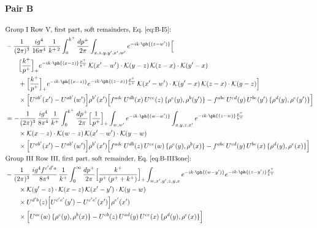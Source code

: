 \paragraph{Pair B}
\begingroup\color{pB}
\begin{align}
&\text{Group I Row V, first part, soft remainders, Eq.~\eqref{eq:B-I5}:}\notag\\
&-\frac{1}{(2\pi)^{3}}\,\frac{ig^{4}}{16\pi^{4}}\,\frac{1}{k^{+\,2}}\int_{0}^{k^{+}}\frac{dp^{+}}{2\pi}\int_{x,z,y,y',x',w'}e^{-ik\cdot\ph{(z-w')}}\Big[\notag\\
&\qquad\Big[\frac{k^{+}}{p^{+}}\Big]_{+}e^{-ik\cdot\ph{(x-z)}\frac{p^{+}}{k^{+}}}\,\mathcal{K}(x'-w')\cdot\mathcal{K}(y-z)\,\mathcal{K}(z-x)\cdot\mathcal{K}(y'-x)\notag\\
&\qquad+\Big[\frac{k^{+}}{p^{+}}\Big]_{+}e^{-ik\cdot\ph{(x-z)}}e^{-ik\cdot\ph{(z-x)}\frac{p^{+}}{k^{+}}}\,\mathcal{K}(x'-w')\cdot\mathcal{K}(y'-x)\,\mathcal{K}(z-x)\cdot\mathcal{K}(y-z)\Big]\notag\\
&\qquad\times\Big[U^{ab'}(x')-U^{ab'}(w')\Big]\rho^{b'}(x')\Big[f^{adc}\,U^{db}(x)\,U^{ce}(z)\,\{\rho^{e}(y),\rho^{b}(y')\}-f^{abc}\,U^{cd}(y)\,U^{be}(y')\,\{\rho^{d}(y),\rho^{e}(y')\}\Big]\notag\\
&=-\frac{1}{(2\pi)^{3}}\,\frac{ig^{4}}{8\pi^{4}}\,\frac{1}{k^{+}}\int_{0}^{k^{+}}\frac{dp^{+}}{2\pi}\Big[\frac{1}{p^{+}}\Big]_{+}\int_{w,w'}e^{-ik\cdot\ph{(w-w')}}\int_{x,y,z,x'}e^{-ik\cdot\ph{(z-w)}\frac{p^{+}}{k^{+}}}\notag\\
&\qquad\times\mathcal{K}(x-z)\cdot\mathcal{K}(w-z)\,\mathcal{K}(x'-w')\cdot\mathcal{K}(y-w)\notag\\
&\qquad\times\Big[U^{ab'}(x')-U^{ab'}(w')\Big]\rho^{b'}(x')\Big[f^{adc}\,U^{db}(z)\,U^{ce}(w)\,\{\rho^{e}(y),\rho^{b}(x)\}-f^{abc}\,U^{cd}(y)\,U^{be}(x)\,\{\rho^{d}(y),\rho^{e}(x)\}\Big]\notag\\
&\text{Group III Row III, first part, soft remainder, Eq.~\eqref{eq:B-III3one}:}\notag\\
&-\frac{1}{(2\pi)^{3}}\,\frac{ig^{4}f^{c'd'a}}{8\pi^{4}}\,\frac{1}{k^{+}}\int_{0}^{\infty}\frac{dp^{+}}{2\pi}\Big[\frac{k^{+}}{p^{+}\,(p^{+}+k^{+})}\Big]_{+}\int_{w,x',y',z,y,x}e^{-ik\cdot\ph{(w-y')}}e^{-ik\cdot\ph{(z-y')}\frac{p^{+}}{k^{+}}}\notag\\
&\qquad\times\mathcal{K}(y'-z)\cdot\mathcal{K}(x-z)\,\mathcal{K}(x'-y')\cdot\mathcal{K}(y-w)\notag\\
&\qquad\times U^{d'b}(z)\Big[U^{c'e'}(y')-U^{c'e'}(x')\Big]\rho^{e'}(x')\notag\\
&\qquad\times\Big[U^{ac}(w)\,\{\rho^{c}(y),\rho^{b}(x)\}-U^{cb}(z)\,U^{ad}(y)\,U^{ce}(x)\,\{\rho^{d}(y),\rho^{e}(x)\}\Big]\notag\\

\end{align}
